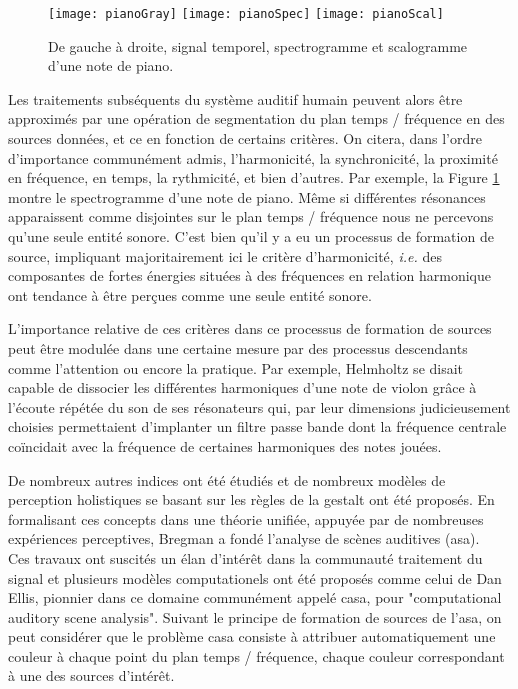 \begin{figure}[t]
  \texttt{[image: pianoGray]}
  \texttt{[image: pianoSpec]}
  \texttt{[image: pianoScal]}
  \caption{De gauche à droite, signal temporel, spectrogramme et scalogramme d'une note de piano.}
  \label{fig:piano}
\end{figure}

Les traitements subséquents du système auditif humain peuvent alors être approximés par une opération de segmentation du plan temps / fréquence en des sources données, et ce en fonction de certains critères.  On citera, dans l'ordre d'importance communément admis, l'harmonicité, la synchronicité, la proximité en fréquence, en temps, la rythmicité, et bien d'autres. Par exemple, la Figure \ref{fig:piano} montre le spectrogramme d'une note de piano. Même si différentes résonances apparaissent comme disjointes sur le plan temps / fréquence nous ne percevons qu'une seule entité sonore. C'est bien qu'il y a eu un processus de formation de source, impliquant majoritairement ici le critère d'harmonicité, \textit{i.e.} des composantes de fortes énergies situées à des fréquences en relation harmonique ont tendance à être perçues comme une seule entité sonore.


L'importance relative de ces critères dans ce processus de formation de sources peut être modulée dans une certaine mesure par des processus descendants comme l'attention ou encore la pratique. Par exemple, Helmholtz se disait capable de dissocier les différentes harmoniques d'une note de violon grâce à l'écoute répétée du son de ses résonateurs qui, par leur dimensions judicieusement choisies permettaient d'implanter un filtre passe bande dont la fréquence centrale coïncidait avec la fréquence de certaines harmoniques des notes jouées.

De nombreux autres indices ont été étudiés et de nombreux modèles de perception holistiques se basant sur les règles de la gestalt\cite{koffka2013principles} ont été proposés. En formalisant ces concepts dans une théorie unifiée, appuyée par de nombreuses expériences perceptives, Bregman a fondé l'analyse de scènes auditives (asa).~\cite{bregman1994auditory} Ces travaux ont suscités un élan d'intérêt dans la communauté traitement du signal et plusieurs modèles computationels ont été proposés comme celui de Dan Ellis\cite{ellis1996prediction}, pionnier dans ce domaine communément appelé casa, pour "computational auditory scene analysis". Suivant le principe de formation de sources de l'asa, on peut considérer que le problème casa consiste à attribuer automatiquement une couleur à chaque point du plan temps / fréquence, chaque couleur correspondant à une des sources d'intérêt.

